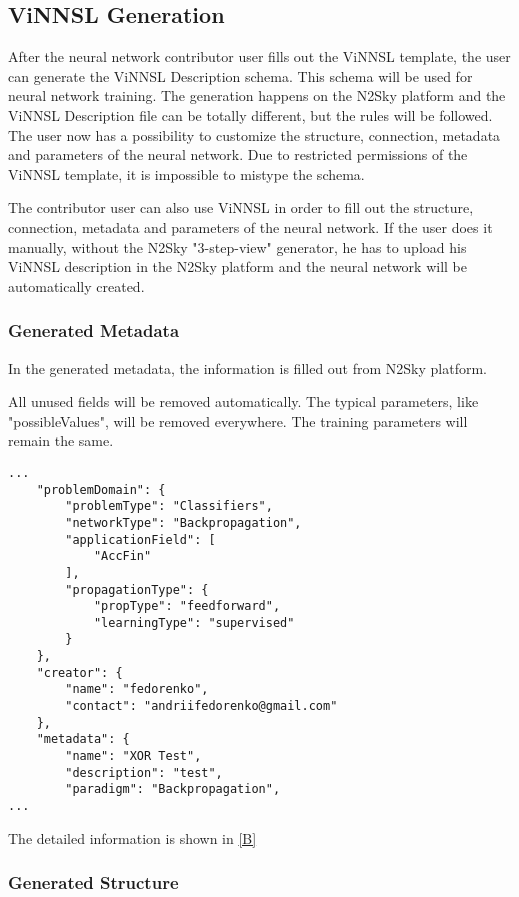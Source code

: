 \subsection{ViNNSL Generation}\label{ViNNSL Generation}

After the neural network contributor user fills out the ViNNSL template, the user can generate the ViNNSL Description schema. This schema will be used for neural network training. The generation happens on the N2Sky platform and the ViNNSL Description file can be totally different, but the rules will be followed. The user now has a possibility to customize the structure, connection, metadata and parameters of the neural network. Due to restricted permissions of the ViNNSL template, it is impossible to mistype the schema.

The contributor user can also use ViNNSL in order to fill out the structure, connection, metadata and parameters of the neural network. If the user does it manually, without the N2Sky "3-step-view" generator, he has to upload his ViNNSL description in the N2Sky platform and the neural network will be automatically created. 

\subsubsection{Generated Metadata}\label{Generated metadata}

In the generated metadata, the information is filled out from N2Sky platform.

All unused fields will be removed automatically. The typical parameters, like "possibleValues", will be removed everywhere. The training parameters will remain the same.

 \begin{lstlisting}[caption=Generated ViNNSL model]
 ...
	"problemDomain": {
		"problemType": "Classifiers",
		"networkType": "Backpropagation",
		"applicationField": [
			"AccFin"
		],
		"propagationType": {
			"propType": "feedforward",
			"learningType": "supervised"
		}
	},
	"creator": {
		"name": "fedorenko",
		"contact": "andriifedorenko@gmail.com"
	},
	"metadata": {
		"name": "XOR Test",
		"description": "test",
		"paradigm": "Backpropagation",
...
\end{lstlisting}

The detailed information is shown in \autoref{B}

\subsubsection{Generated Structure}\label{Generated structure}

